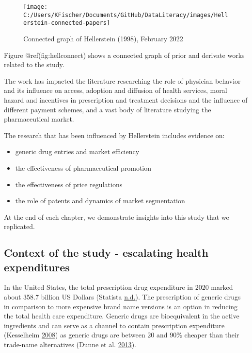 \documentclass[
]{book}
\providecommand{\tightlist}{%
  \setlength{\itemsep}{0pt}\setlength{\parskip}{0pt}}
\begin{document}
\begin{figure}

{\centering \texttt{[image: C:/Users/KFischer/Documents/GitHub/DataLiteracy/images/Hellerstein-connected-papers]} 

}

\caption{Connected graph of Hellerstein (1998), February 2022}\label{fig:hellconnect}
\end{figure}

Figure @ref(fig:hellconnect) shows a connected graph of prior and
derivate works related to the study.

The work has impacted the literature researching the role of physician
behavior and its influence on access, adoption and diffusion of health
services, moral hazard and incentives in prescription and treatment
decisions and the influence of different payment schemes, and a vast
body of literature studying the pharmaceutical market.

The research that has been influenced by Hellerstein includes evidence
on:

\begin{itemize}
\tightlist
\item
  generic drug entries and market efficiency
\item
  the effectiveness of pharmaceutical promotion
\item
  the effectiveness of price regulations
\item
  the role of patents and dynamics of market segmentation
\end{itemize}

At the end of each chapter, we demonstrate insights into this study that
we replicated.

\hypertarget{context-of-the-study---escalating-health-expenditures}{%
\subsection{\texorpdfstring{\textbf{Context of the study - escalating
health
expenditures}}{Context of the study - escalating health expenditures}}\label{context-of-the-study---escalating-health-expenditures}}

In the United States, the total prescription drug expenditure in 2020
marked about 358.7 billion US Dollars (Statista
\protect\hyperlink{ref-statista_prescription_nodate}{n.d.}). The
prescription of generic drugs in comparison to more expensive brand name
versions is an option in reducing the total health care expenditure.
Generic drugs are bioequivalent in the active ingredients and can serve
as a channel to contain prescription expenditure (Kesselheim
\protect\hyperlink{ref-kesselheim_clinical_2008}{2008}) as generic drugs
are between 20 and 90\% cheaper than their trade-name alternatives
(Dunne et al. \protect\hyperlink{ref-dunne_review_2013}{2013}).
\end{document}
